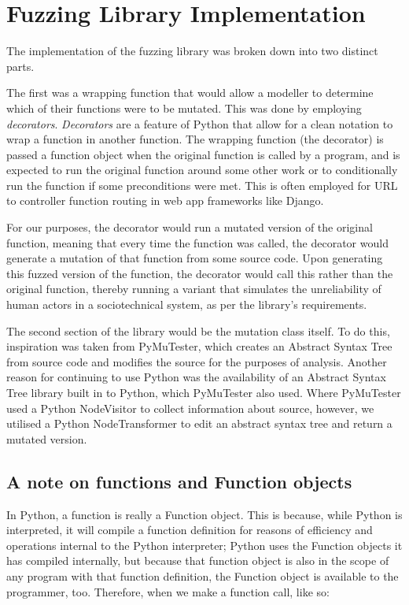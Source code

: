 \chapter{Fuzzing Library Implementation}
The implementation of the fuzzing library was broken down into two distinct parts. \par

The first was a wrapping function that would allow a modeller to determine which of their functions were to be mutated. This was done by employing \emph{decorators}. \emph{Decorators} are a feature of Python that allow for a clean notation to wrap a function in another function. The wrapping function (the decorator) is passed a function object when the original function is called by a program, and is expected to run the original function around some other work or to conditionally run the function if some preconditions were met. This is often employed for URL to controller function routing in web app frameworks like Django\cite{Azzopardi2016a}. \par

For our purposes, the decorator would run a mutated version of the original function, meaning that every time the function was called, the decorator would generate a mutation of that function from some source code. Upon generating this fuzzed version of the function, the decorator would call this rather than the original function, thereby running a variant that simulates the unreliability of human actors in a sociotechnical system, as per the library's requirements. \par

The second section of the library would be the mutation class itself. To do this, inspiration was taken from PyMuTester\cite{GitHu12:online}, which creates an Abstract Syntax Tree from source code and modifies the source for the purposes of analysis. Another reason for continuing to use Python was the availability of an Abstract Syntax Tree library built in to Python\cite{32.2.7:online}, which PyMuTester also used. Where PyMuTester used a Python NodeVisitor to collect information about source, however, we utilised a Python NodeTransformer to edit an abstract syntax tree and return a mutated version. \par

\section{A note on functions and Function objects}
In Python, a function is really a Function object. This is because, while Python is interpreted, it will compile a function definition for reasons of efficiency and operations internal to the Python interpreter; Python uses the Function objects it has compiled internally, but because that function object is also in the scope of any program with that function definition, the Function object is available to the programmer, too. Therefore, when we make a function call, like so: \par


